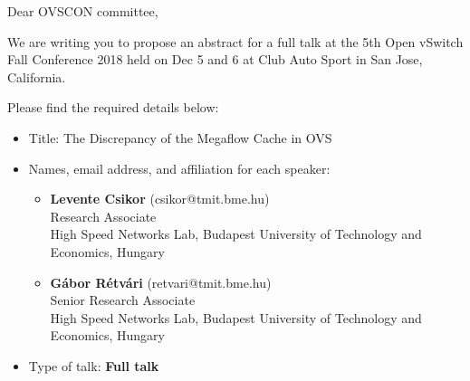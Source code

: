 \documentclass[a4paper,10pt]{article}
\newcommand{\mytitletwo}{The Discrepancy of the Megaflow Cache in OVS}
\begin{document}

\setlength{\parindent}{0pt}
\setlength{\parskip}{9pt}

\newenvironment{macska_item}{
\begin{itemize}
\setlength\itemsep{1em}
\setlength{\parskip}{.5em}
\setlength{\parsep}{0pt}
}
{\end{itemize}}


\normalsize
Dear OVSCON committee,

We are writing you to propose an abstract for a full talk at the 5th Open vSwitch Fall Conference 2018 held on Dec 5 and 6 at Club Auto Sport in San Jose, California.

Please find the required details below:
\begin{itemize}
    \item Title: \mytitletwo
    \item Names, email address, and affiliation for each speaker:\\
   
    \begin{itemize}%
       \item \textbf{Levente Csikor} (csikor@tmit.bme.hu) \\ Research Associate \\High Speed Networks Lab, Budapest University of Technology and Economics, Hungary
        \item \textbf{G\'abor R\'etv\'ari} (retvari@tmit.bme.hu) \\ Senior Research Associate  \\High Speed Networks Lab, Budapest University of Technology and Economics, Hungary
    \end{itemize}
    
    
    \item Type of talk: \textbf{Full talk}

\end{itemize}
\end{document}
